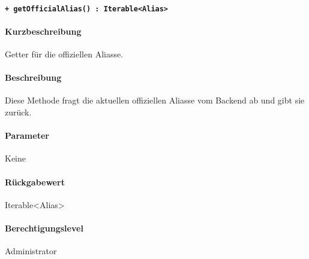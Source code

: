 \paragraph{\texttt{+ getOfficialAlias() : Iterable<Alias>}}\label{AP_Framework_getOfficialAlias}%
\paragraph*{Kurzbeschreibung}
Getter für die offiziellen Aliasse.
\paragraph*{Beschreibung}
Diese Methode fragt die aktuellen offiziellen Aliasse vom Backend ab und gibt sie zurück.
\paragraph*{Parameter}
Keine
\paragraph*{Rückgabewert}
Iterable<Alias>
\paragraph*{Berechtigungslevel}
Administrator